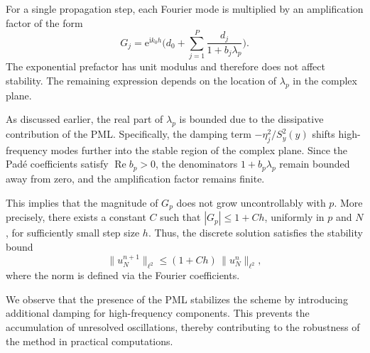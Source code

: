 \documentclass[11pt,a4paper]{article}
\newcommand{\iu}{\mathrm{i}} %
\DeclareMathOperator{\Real}{Re}
\theoremstyle{plain}%
\theoremstyle{definition}
\theoremstyle{remark}
\begin{document}
For a single propagation step, each Fourier mode is multiplied by an amplification factor of the form
\begin{equation*}
    G_j = \mathrm{e}^{\iu k_0 h} \biggl(d_0 + \sum_{j=1}^P \frac{d_j}{1 + b_j \lambda_p} \biggr).
\end{equation*}
The exponential prefactor has unit modulus and therefore does not affect stability. 
The remaining expression depends on the location of $\lambda_p$ in the complex plane.

As discussed earlier, the real part of $\lambda_p$ is bounded due to the dissipative contribution of the PML. 
Specifically, the damping term $-\eta_j^2 / S_y^2(y)$ shifts high-frequency modes further into the stable region of the complex plane. 
Since the Pad\'e coefficients satisfy $\Real b_p > 0$, the denominators $1 + b_p \lambda_p$ remain bounded away from zero,
and the amplification factor remains finite.

This implies that the magnitude of $G_p$ does not grow uncontrollably with $p$. 
More precisely, there exists a constant $C$ such that
   $|G_p| \le 1 + C h$,
uniformly in $p$ and $N$, for sufficiently small step size $h$. 
Thus, the discrete solution satisfies the stability bound
\begin{equation*}
    \|u^{n+1}_N\|_{\ell^2} \le (1 + C h) \,\|u^n_N\|_{\ell^2},
\end{equation*}
where the norm is defined via the Fourier coefficients.

We observe that the presence of the PML stabilizes the scheme by introducing additional damping for high-frequency components. 
This prevents the accumulation of unresolved oscillations, thereby contributing to the robustness of the method in practical computations.
\end{document}
